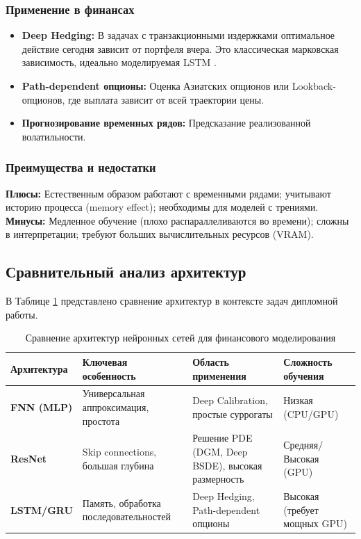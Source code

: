 \subsubsection{Применение в финансах}
\begin{itemize}
    \item \textbf{Deep Hedging:} В задачах с транзакционными издержками оптимальное действие сегодня зависит от портфеля вчера. Это классическая марковская зависимость, идеально моделируемая LSTM \cite{Buehler2019}.
    \item \textbf{Path-dependent опционы:} Оценка Азиатских опционов или Lookback-опционов, где выплата зависит от всей траектории цены.
    \item \textbf{Прогнозирование временных рядов:} Предсказание реализованной волатильности.
\end{itemize}

\subsubsection{Преимущества и недостатки}
\textbf{Плюсы:} Естественным образом работают с временными рядами; учитывают историю процесса (memory effect); необходимы для моделей с трениями. \\
\textbf{Минусы:} Медленное обучение (плохо распараллеливаются во времени); сложны в интерпретации; требуют больших вычислительных ресурсов (VRAM).

\subsection{Сравнительный анализ архитектур}

В Таблице \ref{tab:arch_comparison} представлено сравнение архитектур в контексте задач дипломной работы.

\begin{table}[h!]
    \centering
    \caption{Сравнение архитектур нейронных сетей для финансового моделирования}
    \label{tab:arch_comparison}
    \begin{tabular}{|p{3cm}|p{4cm}|p{4cm}|p{3.5cm}|}
        \hline
        \textbf{Архитектура} & \textbf{Ключевая особенность} & \textbf{Область применения} & \textbf{Сложность обучения} \\
        \hline
        \textbf{FNN (MLP)} & Универсальная аппроксимация, простота & Deep Calibration, простые суррогаты & Низкая (CPU/GPU) \\
        \hline
        \textbf{ResNet} & Skip connections, большая глубина & Решение PDE (DGM, Deep BSDE), высокая размерность & Средняя/Высокая (GPU) \\
        \hline
        \textbf{LSTM/GRU} & Память, обработка последовательностей & Deep Hedging, Path-dependent опционы & Высокая (требует мощных GPU) \\
        \hline
    \end{tabular}
\end{table}

